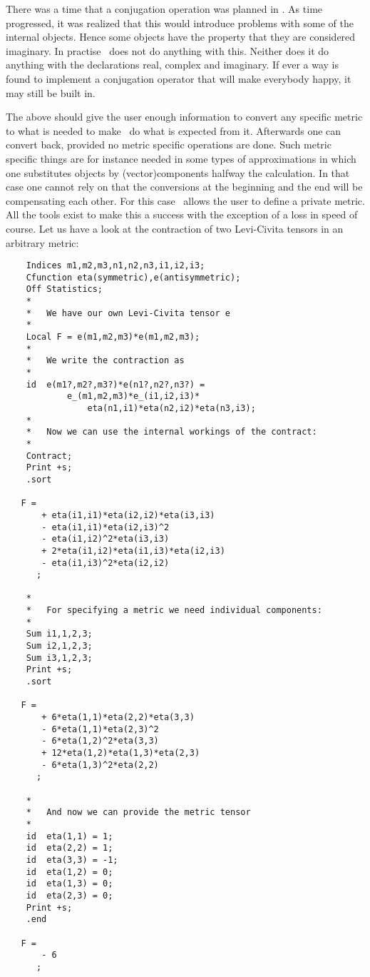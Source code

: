 \noindent There was a time that a conjugation operation 
was planned in \FORM. As time progressed, it was realized that this would 
introduce problems with some of the internal objects. Hence some objects 
have the property that they are considered imaginary. In 
practise \FORM\ does not do anything with this. Neither does it do anything 
with the declarations real, complex and 
imaginary. If ever a way is found to implement a conjugation 
operator that will make everybody happy, it may still be built in. \hfill 
\vspace{2mm}

\noindent The above should give the user enough information to convert any 
specific metric to what is needed to make \FORM\ do what is expected from it. 
Afterwards one can convert back, provided no metric specific 
operations are done. Such metric specific things are for instance needed in 
some types of approximations in which one substitutes objects by 
(vector)components halfway the calculation. In that case one cannot rely on 
that the conversions at the beginning and the end will be compensating each 
other. For this case \FORM\ allows the user to define a private metric. All 
the tools exist to make this a success with the exception of a loss in 
speed of course. Let us have a look at the contraction of two Levi-Civita 
tensors in an arbitrary metric:
\begin{verbatim}
    Indices m1,m2,m3,n1,n2,n3,i1,i2,i3;
    Cfunction eta(symmetric),e(antisymmetric);
    Off Statistics;
    *
    *   We have our own Levi-Civita tensor e
    *
    Local F = e(m1,m2,m3)*e(m1,m2,m3);
    *
    *   We write the contraction as
    *
    id  e(m1?,m2?,m3?)*e(n1?,n2?,n3?) =
            e_(m1,m2,m3)*e_(i1,i2,i3)*
                eta(n1,i1)*eta(n2,i2)*eta(n3,i3);
    *
    *   Now we can use the internal workings of the contract:
    *
    Contract;
    Print +s;
    .sort

   F =
       + eta(i1,i1)*eta(i2,i2)*eta(i3,i3)
       - eta(i1,i1)*eta(i2,i3)^2
       - eta(i1,i2)^2*eta(i3,i3)
       + 2*eta(i1,i2)*eta(i1,i3)*eta(i2,i3)
       - eta(i1,i3)^2*eta(i2,i2)
      ;

    *
    *   For specifying a metric we need individual components:
    *
    Sum i1,1,2,3;
    Sum i2,1,2,3;
    Sum i3,1,2,3;
    Print +s;
    .sort

   F =
       + 6*eta(1,1)*eta(2,2)*eta(3,3)
       - 6*eta(1,1)*eta(2,3)^2
       - 6*eta(1,2)^2*eta(3,3)
       + 12*eta(1,2)*eta(1,3)*eta(2,3)
       - 6*eta(1,3)^2*eta(2,2)
      ;

    *
    *   And now we can provide the metric tensor
    *
    id  eta(1,1) = 1;
    id  eta(2,2) = 1;
    id  eta(3,3) = -1;
    id  eta(1,2) = 0;
    id  eta(1,3) = 0;
    id  eta(2,3) = 0;
    Print +s;
    .end

   F =
       - 6
      ;
\end{verbatim}
